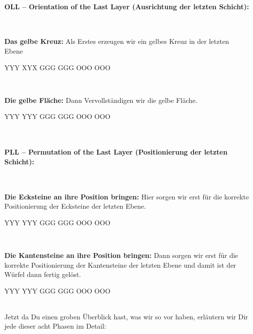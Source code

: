 \paragraph{OLL -- Orientation of the Last Layer (Ausrichtung der letzten Schicht):}\hfill\\[1em]
\parbox{0.7\linewidth}{
  \textbf{Das gelbe Kreuz:} Als Erstes erzeugen wir ein gelbes Kreuz in der letzten Ebene
}\parbox{0.3\linewidth}{
\centering
\RubikCubeGreyAll%
            {Y}{Y}{Y}
            {X}{Y}{X}%
	       {G}{G}{G}
	       {G}{G}{G}%
	       {O}{O}{O}
	       {O}{O}{O}%
}\\[1em]
\parbox{0.7\linewidth}{
  \textbf{Die gelbe Fläche:} Dann Vervollständigen wir die gelbe Fläche.
}\parbox{0.3\linewidth}{
\centering
\RubikCubeGreyAll%
            {Y}{Y}{Y}
            {Y}{Y}{Y}%
	       {G}{G}{G}
	       {G}{G}{G}%
	       {O}{O}{O}
	       {O}{O}{O}%
}\\[1em]
\paragraph{PLL -- Permutation of the Last Layer (Positionierung der letzten Schicht):}\hfill\\[1em]
\parbox{0.7\linewidth}{
  \textbf{Die Ecksteine an ihre Position bringen:} Hier sorgen wir erst für die korrekte Positionierung der Ecksteine der letzten Ebene.
}\parbox{0.3\linewidth}{
\centering
\RubikCubeGreyAll%
            {Y}{Y}{Y}
            {Y}{Y}{Y}%
	       {G}{G}{G}
	       {G}{G}{G}%
	       {O}{O}{O}
	       {O}{O}{O}%
}\\[1em]
\parbox{0.7\linewidth}{
  \textbf{Die Kantensteine an ihre Position bringen:} Dann sorgen wir erst für die korrekte Positionierung der Kantensteine der letzten Ebene und damit ist der Würfel dann fertig gelöst.
}\parbox{0.3\linewidth}{
\centering
\RubikCubeGreyAll%
            {Y}{Y}{Y}
            {Y}{Y}{Y}%
	       {G}{G}{G}
	       {G}{G}{G}%
	       {O}{O}{O}
	       {O}{O}{O}%
}\\[1em]


Jetzt da Du einen groben Überblick hast, was wir so vor haben, erläutern wir Dir jede dieser acht Phasen im Detail:
